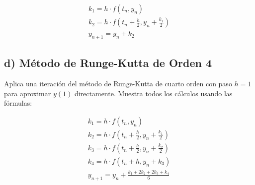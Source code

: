 \documentclass[12pt,a4paper]{article}
\begin{document}
\begin{gather*}
k_1 = h \cdot f(t_n, y_n) \\
k_2 = h \cdot f\left(t_n + \frac{h}{2}, y_n + \frac{k_1}{2}\right) \\
y_{n+1} = y_n + k_2
\end{gather*}

\subsection*{d) Método de Runge-Kutta de Orden 4}
Aplica una iteración del método de Runge-Kutta de cuarto orden con paso \(h = 1\) para aproximar \(y(1)\) directamente. Muestra todos los cálculos usando las fórmulas:

\begin{gather*}
k_1 = h \cdot f(t_n, y_n) \\
k_2 = h \cdot f\left(t_n + \frac{h}{2}, y_n + \frac{k_1}{2}\right) \\
k_3 = h \cdot f\left(t_n + \frac{h}{2}, y_n + \frac{k_2}{2}\right) \\
k_4 = h \cdot f(t_n + h, y_n + k_3) \\
y_{n+1} = y_n + \frac{k_1 + 2k_2 + 2k_3 + k_4}{6}
\end{gather*}
\end{document}
